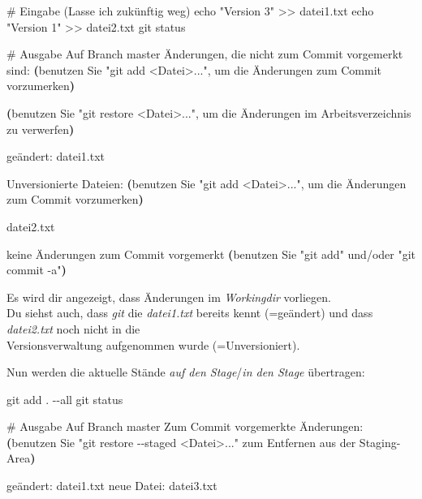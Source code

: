 \documentclass[
  letterpaper,
  DIV=11]{scrreprt}
\newenvironment{Shaded}{\begin{snugshade}}{\end{snugshade}}
\newcommand{\AttributeTok}[1]{\textcolor[rgb]{0.40,0.45,0.13}{#1}}
\newcommand{\BuiltInTok}[1]{\textcolor[rgb]{0.00,0.23,0.31}{#1}}
\newcommand{\CommentTok}[1]{\textcolor[rgb]{0.37,0.37,0.37}{#1}}
\newcommand{\ExtensionTok}[1]{\textcolor[rgb]{0.00,0.23,0.31}{#1}}
\newcommand{\FunctionTok}[1]{\textcolor[rgb]{0.28,0.35,0.67}{#1}}
\newcommand{\KeywordTok}[1]{\textcolor[rgb]{0.00,0.23,0.31}{\textbf{#1}}}
\newcommand{\NormalTok}[1]{\textcolor[rgb]{0.00,0.23,0.31}{#1}}
\newcommand{\OperatorTok}[1]{\textcolor[rgb]{0.37,0.37,0.37}{#1}}
\newcommand{\StringTok}[1]{\textcolor[rgb]{0.13,0.47,0.30}{#1}}
\newcommand{\git}{\textit{git}\xspace}
\newcommand{\datei}[1]{\textit{#1}\xspace}
\newcommand{\work}{\textit{Workingdir}\xspace}
\begin{document}
\begin{Shaded}
\begin{Highlighting}[]
\CommentTok{\# Eingabe (Lasse ich zukünftig weg)}
\BuiltInTok{echo} \StringTok{"Version 3"} \OperatorTok{\textgreater{}\textgreater{}}\NormalTok{ datei1.txt}
\BuiltInTok{echo} \StringTok{"Version 1"} \OperatorTok{\textgreater{}\textgreater{}}\NormalTok{ datei2.txt}
\FunctionTok{git}\NormalTok{ status }

\CommentTok{\# Ausgabe}
\ExtensionTok{Auf}\NormalTok{ Branch master}
\ExtensionTok{Änderungen,}\NormalTok{ die nicht zum Commit vorgemerkt sind:  }
  \KeywordTok{(}\ExtensionTok{benutzen}\NormalTok{ Sie }\StringTok{"git add \textless{}Datei\textgreater{}..."}\NormalTok{,  }
   \ExtensionTok{um}\NormalTok{ die Änderungen zum Commit vorzumerken}\KeywordTok{)}
  
  \KeywordTok{(}\ExtensionTok{benutzen}\NormalTok{ Sie }\StringTok{"git restore \textless{}Datei\textgreater{}..."}\NormalTok{,  }
   \ExtensionTok{um}\NormalTok{ die Änderungen im Arbeitsverzeichnis zu verwerfen}\KeywordTok{)}  

    \ExtensionTok{geändert:}\NormalTok{       datei1.txt}

\ExtensionTok{Unversionierte}\NormalTok{ Dateien:}
  \KeywordTok{(}\ExtensionTok{benutzen}\NormalTok{ Sie }\StringTok{"git add \textless{}Datei\textgreater{}..."}\NormalTok{, }
   \ExtensionTok{um}\NormalTok{ die Änderungen zum Commit vorzumerken}\KeywordTok{)}

    \ExtensionTok{datei2.txt}

\ExtensionTok{keine}\NormalTok{ Änderungen zum Commit vorgemerkt }
\KeywordTok{(}\ExtensionTok{benutzen}\NormalTok{ Sie }\StringTok{"git add"}\NormalTok{ und/oder }\StringTok{"git commit {-}a"}\KeywordTok{)}
\end{Highlighting}
\end{Shaded}

Es wird dir angezeigt, dass Änderungen im \work vorliegen.\\
Du siehst auch, dass \git die \datei{datei1.txt} bereits kennt
(=geändert) und dass \datei{datei2.txt} noch nicht in die\\
Versionsverwaltung aufgenommen wurde (=Unversioniert).

Nun werden die aktuelle Stände \emph{auf den Stage}/\emph{in den Stage}
übertragen:

\begin{Shaded}
\begin{Highlighting}[]
\FunctionTok{git}\NormalTok{ add . }\AttributeTok{{-}{-}all} 
\FunctionTok{git}\NormalTok{ status }

\CommentTok{\# Ausgabe  }
\ExtensionTok{Auf}\NormalTok{ Branch master}
\ExtensionTok{Zum}\NormalTok{ Commit vorgemerkte Änderungen:}
  \KeywordTok{(}\ExtensionTok{benutzen}\NormalTok{ Sie }\StringTok{"git restore {-}{-}staged \textless{}Datei\textgreater{}..."}  
   \ExtensionTok{zum}\NormalTok{ Entfernen aus der Staging{-}Area}\KeywordTok{)}  

    \ExtensionTok{geändert:}\NormalTok{       datei1.txt}
    \ExtensionTok{neue}\NormalTok{ Datei:     datei3.txt}
\end{Highlighting}
\end{Shaded}
\end{document}
